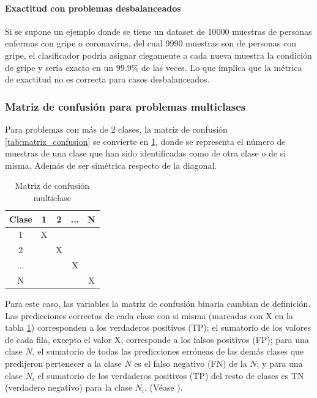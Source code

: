 \paragraph{Exactitud con problemas desbalanceados} \label{par:exactitud_mala} Si se supone un ejemplo donde se tiene un dataset de 10000 muestras de personas enfermas con gripe o coronavirus, del cual 9990 muestras son de personas con gripe, el clasificador podría asignar ciegamente a cada nueva muestra la condición de gripe y sería exacto en un $99.9\%$ de las veces. Lo que implica que la métrica de exactitud no es correcta para casos desbalanceados.

\subsubsection{Matriz de confusión para problemas multiclases}

Para problemas con más de 2 clases, la matriz de confusión \ref{tab:matriz_confusion} se convierte en \ref{tab:matriz_confusion_multiclase}, donde se representa el número de muestras de una clase que han sido identificadas como de otra clase o de si misma. Además de ser simétrica respecto de la diagonal.

\begin{table}[H]
	\centering
	\caption{Matriz de confusión multiclase}
	\label{tab:matriz_confusion_multiclase}
	\begin{tabular}{|c|c|c|c|c|}
		\hline
		Clase & 1 & 2 & ... & N \\ \hline
		1     & X &   &     &   \\ \hline
		2     &   & X &     &   \\ \hline
		...   &   &   & X   &   \\ \hline
		N     &   &   &     & X \\ \hline
	\end{tabular}
\end{table}

Para este caso, las variables la matriz de confusión binaria cambian de definición. Las predicciones correctas de cada clase con si misma (marcadas con X en la tabla \ref{tab:matriz_confusion_multiclase}) corresponden a los verdaderos positivos (TP); el sumatorio de los valores de cada fila, excepto el valor X, corresponde a los falsos positivos (FP); para una clase $N$, el sumatorio de todas las predicciones erróneas de las demás clases que predijeron pertenecer a la clase $N$ es el falso negativo (FN) de la $N$; y para una clase $N_{i}$ el sumatorio de los verdaderos positivos (TP) del resto de clases es TN (verdadero negativo) para la clase $N_{i}$. (Véase ).

